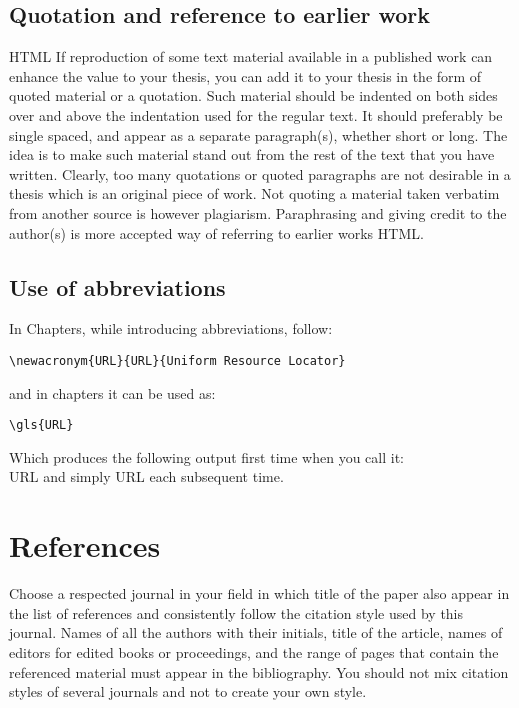 \subsection{Quotation and reference to earlier work}

\gls{HTML} If reproduction of some text material available in a published work can enhance the value to your thesis, you can add it to your thesis in the form of quoted material or a quotation. Such material should be indented on both sides over and above the indentation used for the regular text. It should preferably be single spaced, and appear as a separate paragraph(s), whether short or long. The idea is to make such material stand out from the rest of the text that you have written. Clearly, too many quotations or quoted paragraphs are not desirable in a thesis which is an original piece of work. Not quoting a material taken verbatim from another source is however plagiarism. Paraphrasing and giving credit to the author(s) is more accepted way of referring to earlier works \gls{HTML}. 

\subsection {Use of abbreviations}
In Chapters, while introducing abbreviations, follow:

\begin{verbatim}
\newacronym{URL}{URL}{Uniform Resource Locator}
\end{verbatim}

and in chapters it can be used as:

\begin{verbatim}
\gls{URL}
\end{verbatim}

Which produces the following output first time when you call it: \\ \gls{URL} and simply \gls{URL} each subsequent time.

\section {References}
Choose a respected journal in your field in which title of the paper also appear in the list of references and consistently follow the citation style used by this journal. Names of all the authors with their initials, title of the article, names of editors for edited books or proceedings, and the range of pages that contain the referenced material must appear in the bibliography. You should not mix citation styles of several journals and not to create your own style. 

